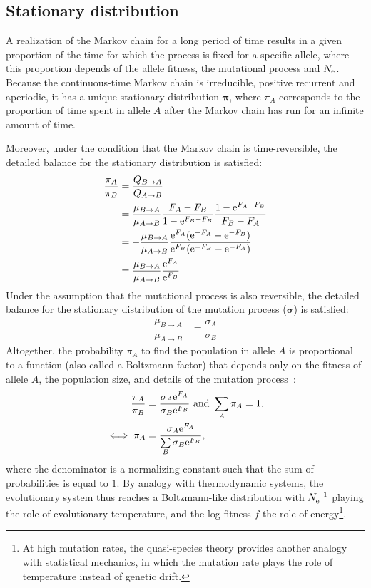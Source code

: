 \subsection{Stationary distribution}

A realization of the Markov chain for a long period of time results in a given proportion of the time for which the process is fixed for a specific allele, where this proportion depends of the allele fitness, the mutational process and $N_{\text{e}}$.
Because the continuous-time Markov chain is irreducible, positive recurrent and aperiodic, it has a unique stationary distribution $\bm{\pi}$, where $\pi_{A}$ corresponds to the proportion of time spent in allele $A$ after the Markov chain has run for an infinite amount of time.

Moreover, under the condition that the Markov chain is time-reversible, the detailed balance for the stationary distribution is satisfied:
\begin{align}
    \dfrac{\pi_{A}}{\pi_{B}} & = \dfrac{Q_{B \to A}}{Q_{A \to B}} \\
    & = \dfrac{\mu_{B \to A}}{\mu_{A \to B}}  \dfrac{F_{A}-F_{B}}{ 1 - \text{e}^{F_{B}-F_{B}}}  \dfrac{1 - \text{e}^{F_{A} - F_{B}} }{F_{B} - F_{A}}\\
    & = - \dfrac{\mu_{B \to A}}{\mu_{A \to B}}  \dfrac{ \text{e}^{F_{A}}(\text{e}^{-F_{A}} - \text{e}^{- F_{B}}) }{ \text{e}^{F_{B}}(\text{e}^{-F_{B}} - \text{e}^{- F_{A}})}  \\
    & = \dfrac{\mu_{B \to A}}{\mu_{A \to B}} \dfrac{\text{e}^{F_{A}}}{\text{e}^{F_{B}}} \\
\end{align}
Under the assumption that the mutational process is also reversible, the detailed balance for the stationary distribution of the mutation process ($\bm{\sigma}$) is satisfied:
\begin{align}
    \dfrac{\mu_{B \to A}}{\mu_{A \to B}} & = \dfrac{\sigma_{A}}{\sigma_{B}}
\end{align}
Altogether, the probability $\pi_{A}$ to find the population in allele $A$ is proportional to a function (also called a Boltzmann factor) that depends only on the fitness of allele $A$, the population size, and details of the mutation process~\citep{Sella2005,Mustonen2005}:
\begin{align}
    \dfrac{\pi_{A}}{\pi_{B}} & = \dfrac{\sigma_{A}\text{e}^{F_{A}}}{\sigma_{B}\text{e}^{F_{B}}} \text{ and } \sum\limits_{A}\pi_{A} = 1, \\
    \iff \pi_{A} & = \dfrac{\sigma_{A}\text{e}^{F_{A}}}{\sum\limits_{B} \sigma_{B}\text{e}^{F_{B}} }, \label{eq:equilibrium-mut-sel}
\end{align}
where the denominator is a normalizing constant such that the sum of probabilities is equal to $1$.
By analogy with thermodynamic systems, the evolutionary system thus reaches a Boltzmann-like distribution with $N_{\text{e}}^{-1}$ playing the role of evolutionary temperature, and the log-fitness $f$ the role of energy\footnote{At high mutation rates, the quasi-species theory provides another analogy with statistical mechanics, in which the mutation rate plays the role of temperature instead of genetic drift.}.

